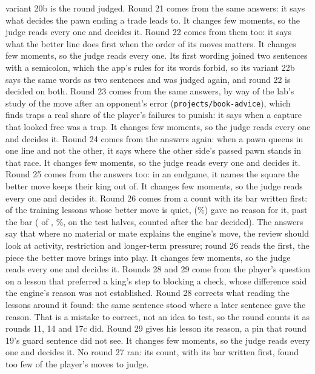 \documentclass[11pt]{article}
\begin{document}
variant 20b is the round judged. Round 21 comes from the same answers: it says what decides the pawn
ending a trade leads to. It changes few moments, so the judge reads every one and decides it. Round
22 comes from them too: it says what the better line does first when the order of its moves
matters. It changes few moments, so the judge reads every one. Its first wording joined two
sentences with a semicolon, which the app's rules for its words forbid, so its variant 22b says the
same words as two sentences and was judged again, and round 22 is decided on both. Round 23 comes
from the same answers, by way of the lab's study of the move after an opponent's error
(\texttt{projects/book-advice}), which finds traps a real share of the player's failures to punish:
it says when a capture that looked free was a trap. It changes few moments, so the judge reads
every one and decides it. Round 24 comes from the answers again: when a pawn queens in one line and
not the other, it says where the other side's passed pawn stands in that race. It changes few
moments, so the judge reads every one and decides it. Round 25 comes from the answers too: in an
endgame, it names the square the better move keeps their king out of. It changes few moments, so
the judge reads every one and decides it. Round 26 comes from a count with its bar written first:
of the \SixCQuiet{} training lessons whose better move is quiet, \SixCNoReason{}
(\SixCShare\%) gave no reason for it, past the bar (\SixCTestNoReason{} of \SixCTestQuiet{},
\SixCTestShare\%, on the test halves, counted after the bar decided). The answers say that where no
material or mate explains the engine's move, the review should look at activity, restriction and
longer-term pressure; round 26 reads the first, the piece the better move brings into play. It
changes few moments, so the judge reads every one and decides it. Rounds 28 and 29 come from the
player's question on a lesson that preferred a king's step to blocking a check, whose difference
said the engine's reason was not established. Round 28 corrects what reading the lessons around it
found: the same sentence stood where a later sentence gave the reason. That is a mistake to
correct, not an idea to test, so the round counts it as rounds 11, 14 and 17c did. Round 29 gives
his lesson its reason, a pin that round 19's guard sentence did not see. It changes few moments,
so the judge reads every one and decides it. No round 27 ran: its count, with its bar written
first, found too few of the player's moves to judge.

\begin{table}[!htbp]
\centering\footnotesize
\RoundsTable
\caption{Every variant. Rates are shares of key moments; \emph{texts changed} counts the test and
train moments whose visible texts differ from the baseline's; \emph{judge} is the round's pooled
preferences, new--old, on train and test (Table~\ref{tab:judge}). The later variants follow.}
\label{tab:rounds}
\end{table}
\end{document}
